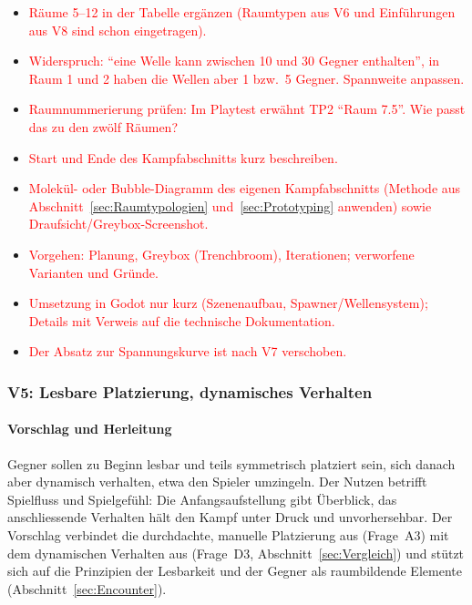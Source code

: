\documentclass[../Main.tex]{subfiles}
\begin{document}
\begin{itemize}[leftmargin=1.5cm]
    \item \textcolor{red}{Räume 5--12 in der Tabelle ergänzen (Raumtypen aus V6 und Einführungen aus V8 sind schon eingetragen).}
    \item \textcolor{red}{Widerspruch: \enquote{eine Welle kann zwischen 10 und 30 Gegner enthalten}, in Raum 1 und 2 haben die Wellen aber 1 bzw.\ 5 Gegner. Spannweite anpassen.}
    \item \textcolor{red}{Raumnummerierung prüfen: Im Playtest erwähnt TP2 \enquote{Raum 7.5}. Wie passt das zu den zwölf Räumen?}
    \item \textcolor{red}{Start und Ende des Kampfabschnitts kurz beschreiben.}
    \item \textcolor{red}{Molekül- oder Bubble-Diagramm des eigenen Kampfabschnitts (Methode aus Abschnitt~\ref{sec:Raumtypologien} und~\ref{sec:Prototyping} anwenden) sowie Draufsicht/Greybox-Screenshot.}
    \item \textcolor{red}{Vorgehen: Planung, Greybox (Trenchbroom), Iterationen; verworfene Varianten und Gründe.}
    \item \textcolor{red}{Umsetzung in Godot nur kurz (Szenenaufbau, Spawner/Wellensystem); Details mit Verweis auf die technische Dokumentation.}
    \item \textcolor{red}{Der Absatz zur Spannungskurve ist nach V7 verschoben.}
\end{itemize}

\subsubsection{V5: Lesbare Platzierung, dynamisches Verhalten} \label{sec:V5}

\paragraph{Vorschlag und Herleitung}
Gegner sollen zu Beginn lesbar und teils symmetrisch platziert sein, sich danach aber dynamisch verhalten, etwa den Spieler umzingeln. Der Nutzen betrifft Spielfluss und Spielgefühl: Die Anfangsaufstellung gibt Überblick, das anschliessende Verhalten hält den Kampf unter Druck und unvorhersehbar. Der Vorschlag verbindet die durchdachte, manuelle Platzierung aus  (Frage~A3) mit dem dynamischen Verhalten aus  (Frage~D3, Abschnitt~\ref{sec:Vergleich}) und stützt sich auf die Prinzipien der Lesbarkeit und der Gegner als raumbildende Elemente (Abschnitt~\ref{sec:Encounter}).
\end{document}

